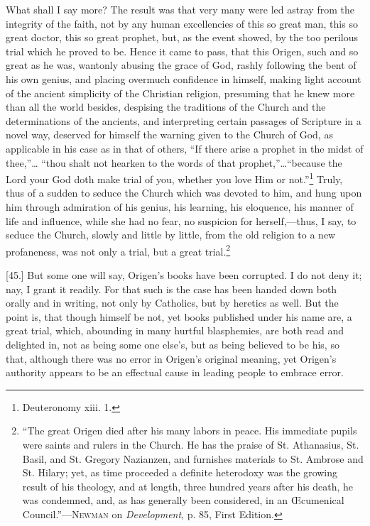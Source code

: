 What shall I say more? The result was that very many were led astray from the integrity of the faith, not by any human excellencies of this so great man, this so great doctor, this so great prophet, but, as the event showed, by the too perilous trial which he proved to be. Hence it came to pass, that this Origen, such and so great as he was, wantonly abusing the grace of God, rashly following the bent of his own genius, and placing overmuch confidence in himself, making light account of the ancient simplicity of the Christian religion, presuming that he knew more than all the world besides, despising the traditions of the Church and the determinations of the ancients, and interpreting certain passages of Scripture in a novel way, deserved for himself the warning given to the Church of God, as applicable in his case as in that of others, “If there arise a prophet in the midst of thee,”… “thou shalt not hearken to the words of that prophet,”…“because the Lord your God doth make trial of you, whether you love Him or not.”\footnote{Deuteronomy xiii. 1.} Truly, thus of a sudden to seduce the Church which was devoted to him, and hung upon him through admiration of his genius, his learning, his eloquence, his manner of life and influence, while she had no fear, no suspicion for herself,—thus, I say, to seduce the Church, slowly and little by little, from the old religion to a new profaneness, was not only a trial, but a great trial.\footnote{“The great Origen died after his many labors in peace. His immediate pupils were saints and rulers in the Church. He has the praise of St. Athanasius, St. Basil, and St. Gregory Nazianzen, and furnishes materials to St. Ambrose and St. Hilary; yet, as time proceeded a definite heterodoxy was the growing result of his theology, and at length, three hundred years after his death, he was condemned, and, as has generally been considered, in an Œcumenical Council.”—\textsc{Newman} on \emph{Development}, p. 85, First Edition.}

[45.] But some one will say, Origen’s books have been corrupted. I do not deny it; nay, I grant it readily. For that such is the case has been handed down both orally and in writing, not only by Catholics, but by heretics as well. But the point is, that though himself be not, yet books published under his name are, a great trial, which, abounding in many hurtful blasphemies, are both read and delighted in, not as being some one else’s, but as being believed to be his, so that, although there was no error in Origen’s original meaning, yet Origen’s authority appears to be an effectual cause in leading people to embrace error.

